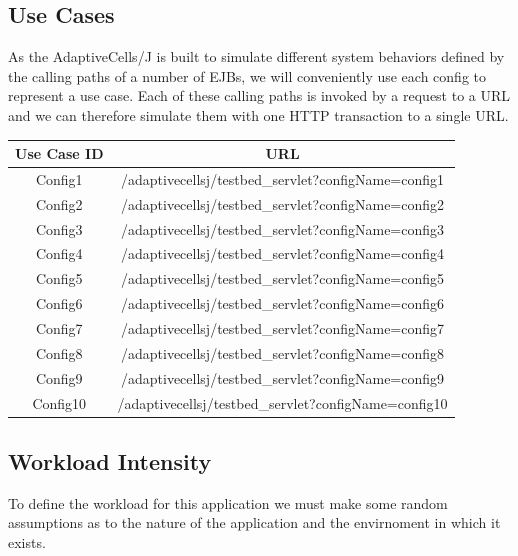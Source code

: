 \subsection{Use Cases}
As the AdaptiveCells/J is built to simulate different system behaviors defined by the calling paths of a number of EJBs, we will conveniently use each config to represent a use case. Each of these calling paths is invoked by a request to a URL and we can therefore simulate them with one HTTP transaction to a single URL.

\begin{center}
\begin{tabular}{| c | c |}
\hline
Use Case ID & URL \\
\hline
Config1 & /adaptivecellsj/testbed\_servlet?configName=config1 \\ 
Config2 & /adaptivecellsj/testbed\_servlet?configName=config2 \\ 
Config3 & /adaptivecellsj/testbed\_servlet?configName=config3 \\ 
Config4 & /adaptivecellsj/testbed\_servlet?configName=config4 \\ 
Config5 & /adaptivecellsj/testbed\_servlet?configName=config5 \\ 
Config6 & /adaptivecellsj/testbed\_servlet?configName=config6 \\ 
Config7 & /adaptivecellsj/testbed\_servlet?configName=config7 \\ 
Config8 & /adaptivecellsj/testbed\_servlet?configName=config8 \\ 
Config9 & /adaptivecellsj/testbed\_servlet?configName=config9 \\ 
Config10 & /adaptivecellsj/testbed\_servlet?configName=config10 \\ 
\hline
\end{tabular}
\end{center}

\subsection{Workload Intensity}

To define the workload for this application we must make some random assumptions as to the nature of the application and the envirnoment in which it exists.

